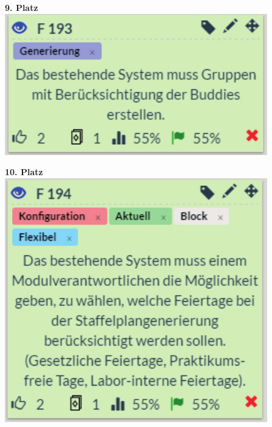 \begin{minipage}[t]{.5\textwidth}
	\centering
   \vspace{16pt}
   		\textbf{9. Platz}\\
   		\vspace{16pt}
		\includegraphics[width=\textwidth]{images/9.pdf}
\end{minipage}
\begin{minipage}[t]{.5\textwidth}
	\centering
   \vspace{16pt}
   		\textbf{10. Platz}\\
   		\vspace{16pt}
		\includegraphics[width=\textwidth]{images/10.pdf}
\end{minipage}

